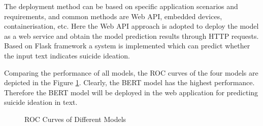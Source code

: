 \documentclass[ %
                    author={Bocheng Wang},
                supervisor={Dr. Qiang Liu},
                    degree={MSc},
                     title={A Research on Identification of Suicide Ideation in Texts with Multiple Models},
                      type={},
                      year={2024}]{dissertation}
\begin{document}
The deployment method can be based on specific application scenarios and requirements, and common methods are Web API, embedded devices, containerisation, etc. Here the Web API approach is adopted to deploy the model as a web service and obtain the model prediction results through HTTP requests. Based on Flask framework a system is implemented which can predict whether the input text indicates suicide ideation.

Comparing the performance of all models, the ROC curves of the four models are depicted in the Figure \ref{fig:rocs}. Clearly, the BERT model has the highest performance. Therefore the BERT model will be deployed in the web application for predicting suicide ideation in text.

\begin{figure}[h]
      \centering
      \hfil
      \hfil
      \hfil
      \caption{ROC Curves of Different Models}
      \label{fig:rocs}
\end{figure}
\end{document}
